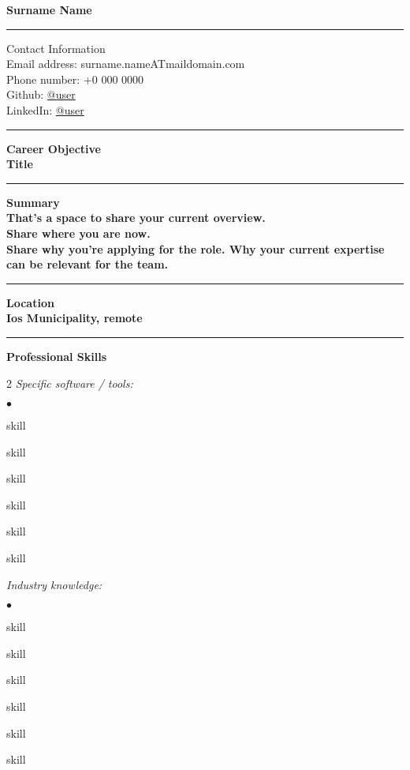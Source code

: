 \documentclass[oneside,final,12pt]{extreport}
\newenvironment{compactlist}{
	\begin{list}{{$\bullet$}}{
		\setlength\leftmargin{0.4cm}
		\setlength\partopsep{0pt}
		\setlength\parskip{0pt}
		\setlength\parsep{0pt}
		\setlength\topsep{0pt}
		\setlength\itemsep{0pt}
	}
}{
	\end{list}
}
\begin{document}
\bfseries
Surname Name \\
\rule{\textwidth}{0.4pt}
Contact Information \\
\noindent
\mdseries
Email address: 
surname.nameATmaildomain.com \\
Phone number: 
+0 000 0000 \\
Github:
\href{https://github.com/user}{@user} \\
LinkedIn:
\href{https://www.linkedin.com/in/username}{@user} \\
\rule{\textwidth}{0.4pt}

\bfseries
Career Objective \\
\mdseries
Title \\
\rule{\textwidth}{0.4pt}

\bfseries
Summary \\
\mdseries
That's a space to share your current overview. \\
Share where you are now. \\[5pt]
Share why you're applying for the role. Why your current expertise can be relevant for the team. \\
\rule{\textwidth}{0.4pt}

\bfseries
Location \\
\mdseries
Ios Municipality, remote \\
\rule{\textwidth}{0.4pt}

\bfseries
Professional Skills
\mdseries
\begin{multicols}{2}
\textsl{Specific software / tools:}
	\begin{compactlist}
		\item skill
		\item skill
		\item skill
		\item skill
		\item skill
		\item skill
	\end{compactlist}
\textsl{Industry knowledge:}
	\begin{compactlist}
		\item skill
		\item skill
		\item skill
		\item skill
		\item skill
		\item skill
	\end{compactlist}
\end{multicols}
\end{document}
